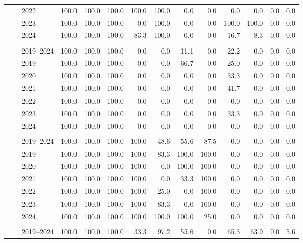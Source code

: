 \begin{table}[htbp]
\begin{tabular}{lllrrrrrrrrrrr}
 & & 2022 & 100.0 & 100.0 & 100.0 & 100.0 & 100.0 & 0.0 & 0.0 & 0.0 & 0.0 & 0.0 & 0.0 \\
 & & 2023 & 100.0 & 100.0 & 100.0 & 0.0 & 100.0 & 0.0 & 0.0 & 100.0 & 100.0 & 0.0 & 0.0 \\
 & & 2024 & 100.0 & 100.0 & 100.0 & 83.3 & 100.0 & 0.0 & 0.0 & 16.7 & 8.3 & 0.0 & 0.0 \\
\addlinespace[2pt]
\multicolumn{14}{l}{\textit{Medellín --- Female child}} \\
 & & 2019–2024 & 100.0 & 100.0 & 100.0 & 0.0 & 0.0 & 11.1 & 0.0 & 22.2 & 0.0 & 0.0 & 0.0 \\
 & & 2019 & 100.0 & 100.0 & 100.0 & 0.0 & 0.0 & 66.7 & 0.0 & 25.0 & 0.0 & 0.0 & 0.0 \\
 & & 2020 & 100.0 & 100.0 & 100.0 & 0.0 & 0.0 & 0.0 & 0.0 & 33.3 & 0.0 & 0.0 & 0.0 \\
 & & 2021 & 100.0 & 100.0 & 100.0 & 0.0 & 0.0 & 0.0 & 0.0 & 41.7 & 0.0 & 0.0 & 0.0 \\
 & & 2022 & 100.0 & 100.0 & 100.0 & 0.0 & 0.0 & 0.0 & 0.0 & 0.0 & 0.0 & 0.0 & 0.0 \\
 & & 2023 & 100.0 & 100.0 & 100.0 & 0.0 & 0.0 & 0.0 & 0.0 & 33.3 & 0.0 & 0.0 & 0.0 \\
 & & 2024 & 100.0 & 100.0 & 100.0 & 0.0 & 0.0 & 0.0 & 0.0 & 0.0 & 0.0 & 0.0 & 0.0 \\
\addlinespace[2pt]
\multicolumn{14}{l}{\textit{Cali --- Adult male}} \\
 & & 2019–2024 & 100.0 & 100.0 & 100.0 & 100.0 & 48.6 & 55.6 & 87.5 & 0.0 & 0.0 & 0.0 & 0.0 \\
 & & 2019 & 100.0 & 100.0 & 100.0 & 100.0 & 83.3 & 100.0 & 100.0 & 0.0 & 0.0 & 0.0 & 0.0 \\
 & & 2020 & 100.0 & 100.0 & 100.0 & 100.0 & 0.0 & 100.0 & 100.0 & 0.0 & 0.0 & 0.0 & 0.0 \\
 & & 2021 & 100.0 & 100.0 & 100.0 & 100.0 & 0.0 & 33.3 & 100.0 & 0.0 & 0.0 & 0.0 & 0.0 \\
 & & 2022 & 100.0 & 100.0 & 100.0 & 100.0 & 25.0 & 0.0 & 100.0 & 0.0 & 0.0 & 0.0 & 0.0 \\
 & & 2023 & 100.0 & 100.0 & 100.0 & 100.0 & 83.3 & 0.0 & 100.0 & 0.0 & 0.0 & 0.0 & 0.0 \\
 & & 2024 & 100.0 & 100.0 & 100.0 & 100.0 & 100.0 & 100.0 & 25.0 & 0.0 & 0.0 & 0.0 & 0.0 \\
\addlinespace[2pt]
\multicolumn{14}{l}{\textit{Cali --- Adult female}} \\
 & & 2019–2024 & 100.0 & 100.0 & 100.0 & 33.3 & 97.2 & 55.6 & 0.0 & 65.3 & 63.9 & 0.0 & 5.6 \\

\end{tabular}
\end{table}
